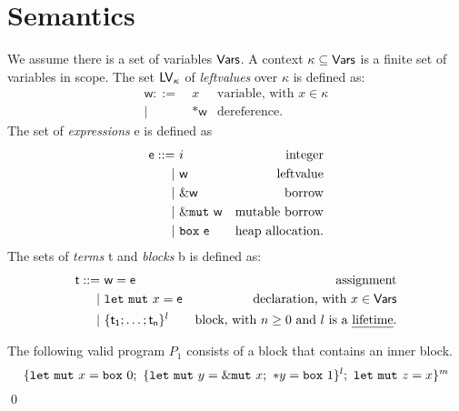 \section{Semantics}\label{sec:semantics}

\begin{definition}
  We assume there is a set of variables $\mathsf{Vars}$.
  A context $\kappa\subseteq\mathsf{Vars}$ is a finite set of variables in scope.
  The set $\mathsf{LV}_\kappa$ of \emph{leftvalues} over $\kappa$ is defined as:
  \begin{align*}
    \mathsf{w} ::= &\ x & \text{variable, with $x\in\kappa$}\\
    | &\ \mathtt{*}\mathsf{w} & \text{dereference.}
  \end{align*}
  The set of \emph{expressions} \textsf{e} is defined as
  \begin{align*}
    \mathsf{e} ::= &\ i & \text{integer}\\
    | &\ \mathsf{w} & \text{leftvalue}\\
    | &\ \&\mathsf{w} & \text{borrow}\\
    | &\ \&\mathtt{mut}\ \mathsf{w} & \text{mutable borrow}\\
    | &\ \mathtt{box}\ \mathsf{e} & \text{heap allocation.}
  \end{align*}
  The sets of \emph{terms} \textsf{t} and \emph{blocks} \textsf{b}
  is defined as:
  \begin{align*}
    \mathsf{t} ::= &\ \mathsf{w}=\mathsf{e} & \text{assignment}\\
    | &\ \mathtt{let\ mut}\ x=\mathsf{e} & \text{declaration, with $x\in\mathsf{Vars}$}\\
    | &\ \{\mathsf{t_1};\ldots;\mathsf{t_n}\}^l & \text{block, with $n\ge 0$ and $l$ is a \emph{lifetime}.}
  \end{align*}
\end{definition}

\begin{example}\label{ex:program}
  The following valid program $P_1$ consists of a block that contains an inner block.
  \[
    \{
      \mathtt{let\ mut}\ x = \mathtt{box}\ 0;\
      \{\mathtt{let\ mut}\ y = \&\mathtt{mut}\  x;\
      \mathtt{*}y = \mathtt{box}\ 1\}^l;\
      \mathtt{let\ mut}\ z = x
    \}^m
  \]
  \qed
\end{example}

